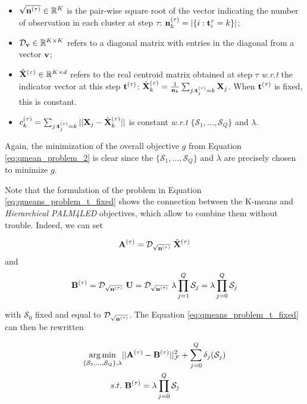 \begin{itemize}
 \item $\sqrt{{\mathbf{n}}^{(\tau)}} \in {\mathbb{R}^{K}}$ is the pair-wise square root of the vector indicating the number of observation in each cluster at step $\tau$: ${\mathbf{n}}_k^{(\tau)} = |\{i: {\mathbf{t}}^\tau_i = k\}|$;
 \item $\mathcal{D}_{\mathbf{v}} \in \mathbb{R}^{K \times K}$ refers to a diagonal matrix with entries in the diagonal from a vector ${\mathbf{v}}$;
 \item $\hat{{\mathbf{X}}}^{(\tau)} \in \mathbb{R}^{K \times d}$ refers to the real centroid matrix obtained at step $\tau$ \textit{w.r.t} the indicator vector at this step ${\mathbf{t}}^{(\tau)}$: $\hat{{\mathbf{X}}}^{(\tau)}_k = \frac{1}{{\mathbf{n}}_k}\sum_{j:{\mathbf{t}}^{(\tau)}_j = k} {{\mathbf{X}}_j}$. When ${\mathbf{t}}^{(\tau)}$ is fixed, this is constant.
 \item $c_k^{(\tau)} = \sum_{j: {\mathbf{t}}^{(\tau)}_j = k}^{}||{\mathbf{X}}_j - \hat{{\mathbf{X}}}_k^{(\tau)}||$ is constant \textit{w.r.t} $\{ \mathcal{S}_1, \ldots,\mathcal{S}_Q\}$ and $\lambda$.
\end{itemize}

Again,  the minimization of the overall objective $g$ from Equation \ref{eq:qmean_problem_2} is clear since the $\{ \mathcal{S}_1, \ldots,\mathcal{S}_Q\}$ and $\lambda$ are precisely chosen to minimize $g$.

Note that the formulation of the problem in Equation \ref{eq:qmeans_problem_t_fixed} shows the connection between the K-means and \textit{Hierarchical PALM4LED} objectives, which allow to combine them without trouble. Indeed, we can set

\begin{equation*}
{\mathbf{A}}^{(\tau)} = \mathcal{D}_{\sqrt{{\mathbf{n}}^{(\tau)}}}~\hat{{\mathbf{X}}}^{(\tau)}
\end{equation*}
and
\begin{equation*}
{\mathbf{B}}^{(\tau)} = \mathcal{D}_{\sqrt{{\mathbf{n}}^{(\tau)}}}~{\mathbf{U}} = \mathcal{D}_{\sqrt{{\mathbf{n}}^{(\tau)}}}~\lambda \prod_{j=1}^{Q}{\mathcal{S}_j} = \lambda \prod_{j=0}^{Q}{\mathcal{S}_j}
\end{equation*}

with $\mathcal{S}_0$ fixed and equal to $\mathcal{D}_{\sqrt{{\mathbf{n}}^{(\tau)}}}$. The Equation \ref{eq:qmeans_problem_t_fixed} can then be rewritten 

\begin{equation}
\begin{split}
 \operatorname*{arg\,min}_{\{ \mathcal{S}_1, \ldots,\mathcal{S}_Q\}, \lambda} & ||{\mathbf{A}}^{(\tau)} - {\mathbf{B}}^{(\tau)}||_{\mathcal{F}} ^ 2  +  \sum_{j=0}^{Q} \delta_j(\mathcal{S}_j)\\
 s.t. &~ {\mathbf{B}}^{(\tau)} = \lambda \prod_{j=0}^{Q}{\mathcal{S}_j}
\end{split}
\end{equation}


